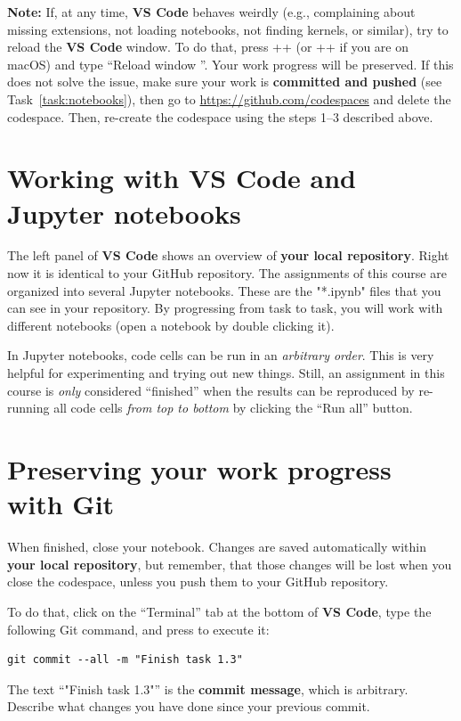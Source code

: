 \documentclass[12pt,a4paper]{article}
\begin{document}
\textbf{Note:} If, at any time, \textbf{VS Code} behaves weirdly (e.g., complaining about missing extensions, not loading notebooks, not finding kernels, or similar), try to reload the \textbf{VS Code} window. To do that, press \Ctrl+\keystroke{\shift}+ (or \keystroke{\cmd}+\keystroke{\shift}+ if you are on macOS) and type ``Reload window \Return''. Your work progress will be preserved. If this does not solve the issue, make sure your work is \textbf{committed and pushed} (see Task~\ref{task:notebooks}), then go to \url{https://github.com/codespaces} and delete the codespace. Then, re-create the codespace using the steps 1--3 described above.

\section{Working with VS Code and Jupyter notebooks}
\label{task:jupyter}

The left panel of \textbf{VS Code} shows an overview of \textbf{your local repository}. Right now it is identical to your GitHub repository. The assignments of this course are organized into several Jupyter notebooks. These are the "*.ipynb" files that you can see in your repository. By progressing from task to task, you will work with different notebooks (open a notebook by double clicking it).

In Jupyter notebooks, code cells can be run in an \emph{arbitrary order}. This is very helpful for experimenting and trying out new things. Still, an assignment in this course is \emph{only} considered ``finished'' when the results can be reproduced by re-running all code cells \emph{from top to bottom} by clicking the ``Run all'' button.

\section{Preserving your work progress with Git}
\label{task:git}

When finished, close your notebook. Changes are saved automatically within \textbf{your local repository}, but remember, that those changes will be lost when you close the codespace, unless you push them to your GitHub repository.

To do that, click on the ``Terminal'' tab at the bottom of \textbf{VS Code}, type the following Git command, and press \Return to execute it:
\begin{Verbatim}[frame=single]
git commit --all -m "Finish task 1.3"
\end{Verbatim}
The text ``"Finish task 1.3"'' is the \textbf{commit message}, which is arbitrary. Describe what changes you have done since your previous commit.
\end{document}
